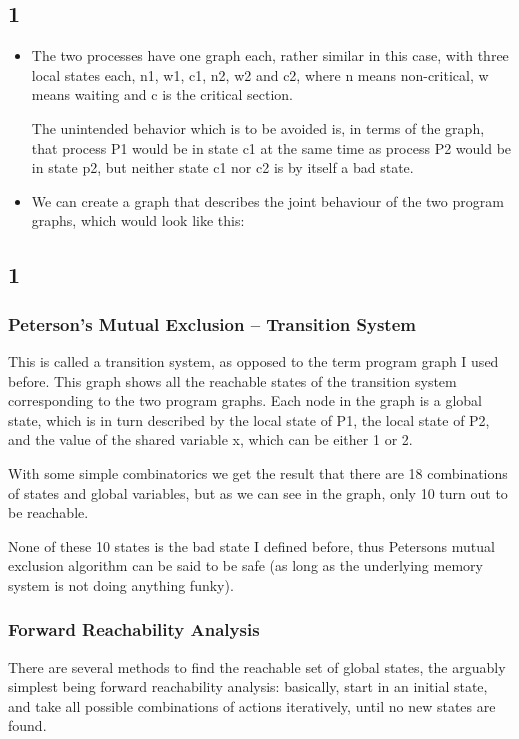 \documentclass[handout]{beamer}
\begin{document}
\begin{footnotesize}
\subsection*{1}
\begin{frame}
\begin{itemize}
\item
The two processes have one graph each, rather similar in this case, with three local states each, n1, w1, c1, n2, w2 and c2, where n means non-critical, w means waiting and c is the critical section.

The unintended behavior which is to be avoided is, in terms of the graph, that process P1 would be in state c1 at the same time as process P2 would be in state p2, but neither state c1 nor c2 is by itself a bad state.
\item
We can create a graph that describes the joint behaviour of the two program graphs, which would look like this:


\end{itemize}
\end{frame}

\subsection*{1}
\begin{frame}
  \frametitle{Peterson's Mutual Exclusion -- Transition System}
This is called a transition system, as opposed to the term program graph I used before. This graph shows all the reachable states of the transition system corresponding to the two program graphs. Each node in the graph is a global state, which is in turn described by the local state of P1, the local state of P2, and the value of the shared variable x, which can be either 1 or 2.

With some simple combinatorics we get the result that there are 18 combinations of states and global variables, but as we can see in the graph, only 10 turn out to be reachable.

None of these 10 states is the bad state I defined before, thus Petersons mutual exclusion algorithm can be said to be safe (as long as the underlying memory system is not doing anything funky).
\end{frame}


\begin{frame}
\frametitle{Forward Reachability Analysis}
There are several methods to find the reachable set of global states, the arguably simplest being forward reachability analysis: basically, start in an initial state, and take all possible combinations of actions iteratively, until no new states are found.


\end{frame}
\end{footnotesize}
\end{document}

